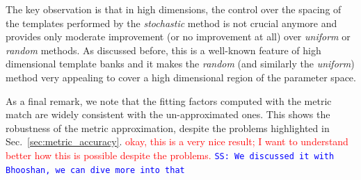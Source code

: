 \documentclass[twocolumn,showpacs,preprintnumbers,nofootinbib,prd,
superscriptaddress,10pt]{revtex4-2}
\newcommand{\stefano}[1]{{\textcolor{blue}{\texttt{SS: #1}} }}
\begin{document}
The key observation is that in high dimensions, the control over the spacing of the templates performed by the {\it stochastic} method is not crucial anymore and provides only moderate improvement (or no improvement at all) over {\it uniform} or {\it random} methods. As discussed before, this is a well-known feature \cite{Messenger:2008ta, Allen:2021yuy, Allen:2022lqr} of high dimensional template banks and it makes the {\it random} (and similarly the {\it uniform}) method very appealing to cover a high dimensional region of the parameter space.

As a final remark, we note that the fitting factors computed with the metric match are widely consistent with the un-approximated ones. This shows the robustness of the metric approximation, despite the problems highlighted in Sec.~\ref{sec:metric_accuracy}. \textcolor{red}{okay, this is a very nice result; I want to understand better how this is possible despite the problems.} \stefano{We discussed it with Bhooshan, we can dive more into that}


\end{document}
